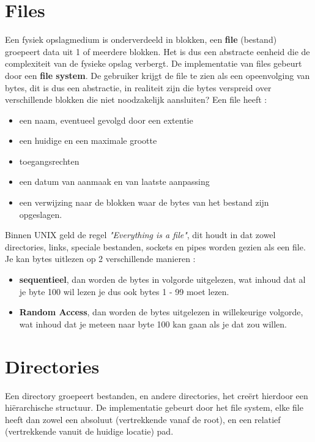 \documentclass{report}
\begin{document}
   		\section{Files}
   			Een fysiek opslagmedium is onderverdeeld in blokken, een \textbf{file} (bestand) groepeert data  uit 1 of meerdere blokken. Het is dus een abstracte eenheid die de complexiteit van de fysieke opslag verbergt. De implementatie van files gebeurt door een \textbf{file system}. De gebruiker krijgt de file te zien als een opeenvolging van bytes, dit is dus een abstractie, in realiteit zijn die bytes verspreid over verschillende blokken die niet noodzakelijk aansluiten?
   			Een file heeft : 
   			\begin{itemize}
   				\item een naam, eventueel gevolgd door een extentie
   				\item een huidige en een maximale grootte 
   				\item toegangsrechten 
   				\item een datum van aanmaak en van laatste aanpassing 
   				\item een verwijzing naar de blokken waar de bytes van het bestand zijn opgeslagen. 
   			\end{itemize}
   		
	   		Binnen UNIX geld de regel \textit{"Everything is a file"}, dit houdt in dat zowel directories, links, speciale bestanden, sockets en pipes worden gezien als een file. \\
	   		Je kan bytes uitlezen op 2 verschillende manieren : 
	   		\begin{itemize}
	   			\item \textbf{sequentieel}, dan worden de bytes in volgorde uitgelezen, wat inhoud dat al je byte 100 wil lezen je dus ook bytes 1 - 99 moet lezen.
	   			\item \textbf{Random Access}, dan worden de bytes uitgelezen in willekeurige volgorde, wat inhoud dat je meteen naar byte 100 kan gaan als je dat zou willen. 
	   		\end{itemize}
   		\section{Directories}
   			Een directory groepeert bestanden, en andere directories, het creërt hierdoor een hiërarchische structuur. De implementatie gebeurt door het file system, elke file heeft dan zowel een absoluut (vertrekkende vanaf de root), en een relatief (vertrekkende vanuit de huidige locatie) pad. 
\end{document}
